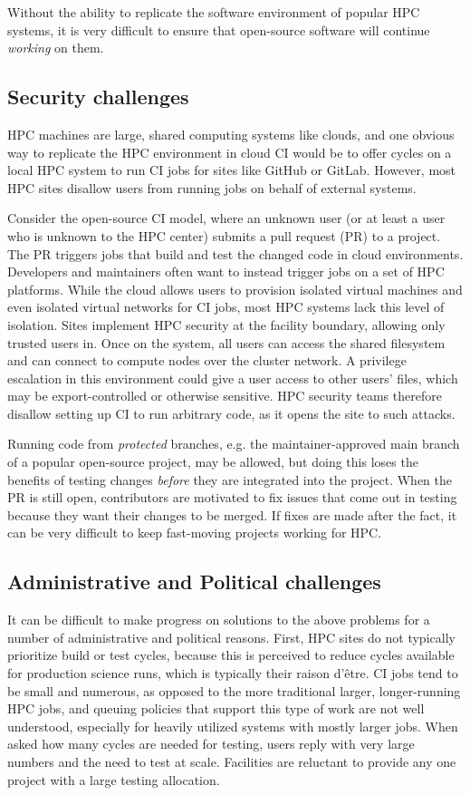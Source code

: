 \documentclass{IEEEcsmag}
\begin{document}
Without the ability to replicate the software environment of popular HPC systems, it is
very difficult to ensure that open-source software will continue {\it working} on them.

\subsection{Security challenges}

HPC machines are large, shared computing systems like clouds, and one obvious way to
replicate the HPC environment in cloud CI would be to offer cycles on a local HPC system
to run CI jobs for sites like GitHub or GitLab. However, most HPC sites disallow users from
running jobs on behalf of external systems.

Consider the open-source CI model, where an unknown user (or at least a user who is
unknown to the HPC center) submits a pull request (PR) to a project. The PR triggers jobs
that build and test the changed code in cloud environments.
%
Developers and maintainers often want to instead trigger jobs on a set of HPC platforms.
%
While the cloud allows users to provision isolated virtual machines and even isolated
virtual networks for CI jobs, most HPC systems lack this level of isolation. Sites implement
HPC security at the facility boundary, allowing only trusted users in.
Once on the system, all users can access the shared filesystem and can
connect to compute nodes over the cluster network. A privilege escalation in this
environment could give a user access to other users' files, which may be export-controlled
or otherwise sensitive. HPC security teams therefore disallow setting up CI
to run arbitrary code, as it opens the site to such attacks.

Running code from {\it protected} branches, e.g. the
maintainer-approved main branch of a popular open-source project, may be allowed, but doing
this loses the
benefits of testing changes {\it before} they are integrated into the project. When the
PR is still open, contributors are motivated to fix issues that come out in testing
because they want their changes to be merged. If fixes are made after the fact, it can
be very difficult to keep fast-moving projects working for HPC.


\subsection{Administrative and Political challenges}

It can be difficult to make progress on solutions to the above problems for a number of
administrative and political reasons. First, HPC sites do not typically prioritize build
or test cycles, because this is perceived to reduce cycles available
for production science runs, which is typically their raison d'\^etre. CI jobs tend
to be small and numerous, as opposed to the
more traditional larger, longer-running HPC jobs, and queuing policies that support this type of
work are not well understood, especially for heavily utilized systems with mostly larger jobs.
When asked how many cycles are needed for testing, users reply with very large numbers and
the need to test at scale. Facilities are reluctant to provide any one project
with a large testing allocation.
\end{document}
